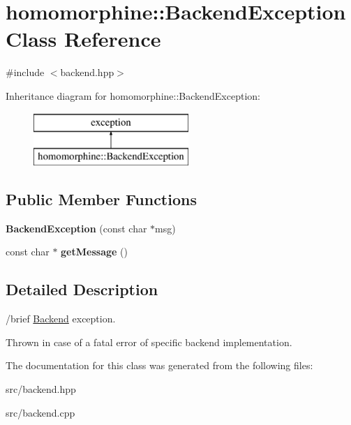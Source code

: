 \hypertarget{classhomomorphine_1_1_backend_exception}{}\section{homomorphine\+::Backend\+Exception Class Reference}
\label{classhomomorphine_1_1_backend_exception}


{\ttfamily \#include $<$backend.\+hpp$>$}

Inheritance diagram for homomorphine\+::Backend\+Exception\+:\begin{figure}[H]
\begin{center}
\leavevmode
\includegraphics[height=2.000000cm]{classhomomorphine_1_1_backend_exception}
\end{center}
\end{figure}
\subsection*{Public Member Functions}
\begin{DoxyCompactItemize}
\item 
\mbox{\label{classhomomorphine_1_1_backend_exception_add89cd603a906324b3d9f899c71bab50}} 
{\bfseries Backend\+Exception} (const char $\ast$msg)
\item 
\mbox{\label{classhomomorphine_1_1_backend_exception_a5b6595c44ccf8e2196c7989f695d71a4}} 
const char $\ast$ {\bfseries get\+Message} ()
\end{DoxyCompactItemize}


\subsection{Detailed Description}
/brief \mbox{\hyperlink{classhomomorphine_1_1_backend}{Backend}} exception.

Thrown in case of a fatal error of specific backend implementation. 

The documentation for this class was generated from the following files\+:\begin{DoxyCompactItemize}
\item 
src/backend.\+hpp\item 
src/backend.\+cpp\end{DoxyCompactItemize}
